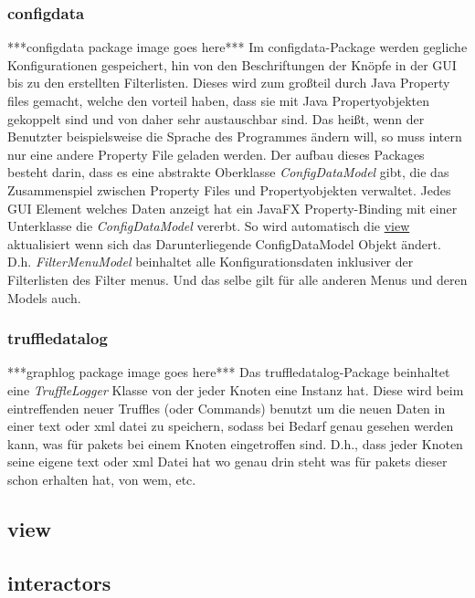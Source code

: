     \subsubsection{configdata}
    \label{subsubsec:configdata}
    ***configdata package image goes here***
    \newline
    \newline
    Im configdata-Package werden gegliche Konfigurationen gespeichert, hin von den
    Beschriftungen der Knöpfe in der GUI bis zu den erstellten Filterlisten. Dieses
    wird zum großteil durch Java Property files gemacht, welche den vorteil haben, dass
    sie mit Java Propertyobjekten gekoppelt sind und von daher sehr austauschbar sind.
    Das heißt, wenn der Benutzter beispielsweise die Sprache des Programmes ändern
    will, so muss intern nur eine andere Property File geladen werden.
    \newline
    \newline
    Der aufbau dieses Packages besteht darin, dass es eine abstrakte Oberklasse
    \textit{ConfigDataModel} gibt, die das Zusammenspiel zwischen Property Files
    und Propertyobjekten verwaltet. Jedes GUI Element welches Daten anzeigt hat
    ein JavaFX Property-Binding mit einer Unterklasse die \textit{ConfigDataModel}
    vererbt. So wird automatisch die \hyperref[subsec:view]{view} aktualisiert
    wenn sich das Darunterliegende ConfigDataModel Objekt ändert. D.h.
    \textit{FilterMenuModel} beinhaltet alle Konfigurationsdaten inklusiver der
    Filterlisten des Filter menus. Und das selbe gilt für alle anderen Menus und
    deren Models auch.


    \subsubsection{truffledatalog}
    \label{subsubsec:graphlog}
    ***graphlog package image goes here***
    \newline
    \newline
    Das truffledatalog-Package beinhaltet eine \textit{TruffleLogger} Klasse von
    der jeder Knoten eine Instanz hat. Diese wird beim eintreffenden neuer Truffles
    (oder Commands) benutzt um die neuen Daten in einer text oder xml datei zu speichern,
    sodass bei Bedarf genau gesehen werden kann, was für \glspl{paket} bei einem
    Knoten eingetroffen sind. D.h., dass jeder Knoten seine eigene text oder xml
    Datei hat wo genau drin steht was für \glspl{paket} dieser schon erhalten hat,
    von wem, etc.

\subsection{view}
\label{subsec:view}

\subsection{interactors}
\label{subsec:interactors}
